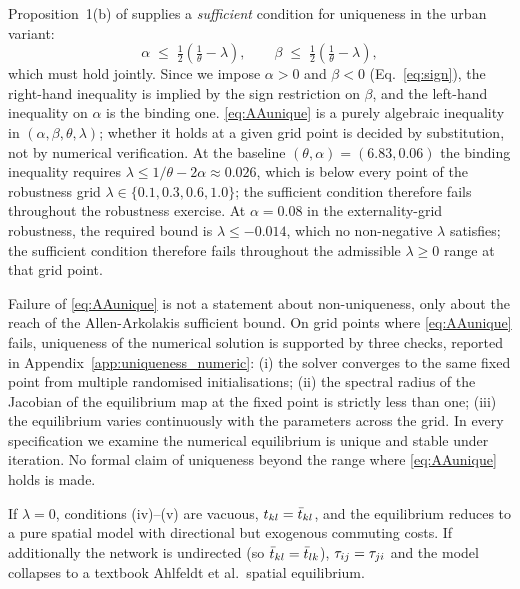 Proposition~1(b) of \cite{AllenArkolakis2022} supplies a
\emph{sufficient} condition for uniqueness in the urban variant:
\begin{equation}
  \alpha\;\le\;\tfrac{1}{2}\!\left(\tfrac{1}{\theta}-\lambda\right),
  \qquad
  \beta\;\le\;\tfrac{1}{2}\!\left(\tfrac{1}{\theta}-\lambda\right),
  \label{eq:AAunique}
\end{equation}
which must hold jointly.  Since we impose $\alpha>0$ and $\beta<0$
(Eq.~\eqref{eq:sign}), the right-hand inequality is implied by the
sign restriction on $\beta$, and the left-hand inequality on
$\alpha$ is the binding one.  \eqref{eq:AAunique} is a purely
algebraic inequality in $(\alpha,\beta,\theta,\lambda)$; whether it
holds at a given grid point is decided by substitution, not by
numerical verification.  At the baseline $(\theta,\alpha)=(6.83,0.06)$
the binding inequality requires $\lambda\le 1/\theta-2\alpha
\approx 0.026$, which is below every point of the robustness grid
$\lambda\in\{0.1,0.3,0.6,1.0\}$; the sufficient condition therefore
fails throughout the robustness exercise.  At $\alpha=0.08$ in the externality-grid
robustness, the required bound is $\lambda\le -0.014$, which no
non-negative $\lambda$ satisfies; the sufficient condition therefore
fails throughout the admissible $\lambda\ge 0$ range at that grid
point.

Failure of \eqref{eq:AAunique} is not a statement about
non-uniqueness, only about the reach of the Allen-Arkolakis sufficient
bound.  On grid points where \eqref{eq:AAunique} fails, uniqueness of
the numerical solution is supported by three checks, reported in
Appendix~\ref{app:uniqueness_numeric}: (i) the solver converges to
the same fixed point from multiple randomised initialisations;
(ii) the spectral radius of the Jacobian of the equilibrium map at
the fixed point is strictly less than one; (iii) the equilibrium
varies continuously with the parameters across the grid.  In every
specification we examine the numerical equilibrium is unique and
stable under iteration.  No formal claim of uniqueness beyond the
range where \eqref{eq:AAunique} holds is made.

\begin{remark}\label{rem:degenerate}
If $\lambda=0$, conditions (iv)--(v) are vacuous, $t_{kl}=\bar t_{kl}$,
and the equilibrium reduces to a pure spatial model with directional
but exogenous commuting costs.  If additionally the network is
undirected (so $\bar t_{kl}=\bar t_{lk}$), $\tau_{ij}=\tau_{ji}$ and the
model collapses to a textbook Ahlfeldt et al.\ spatial equilibrium.
\end{remark}

